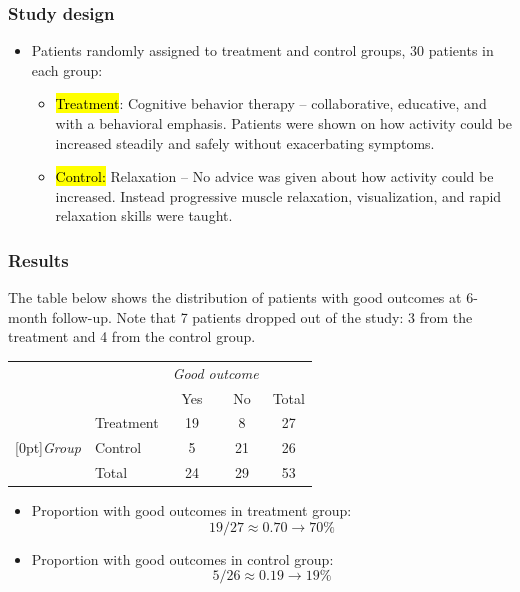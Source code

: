 
\begin{frame}
\frametitle{Study design}

\begin{itemize}

\item Patients randomly assigned to treatment and control groups, 30 patients in each group:
\begin{itemize}
\item \hl{Treatment}: Cognitive behavior therapy -- collaborative, educative, and with a behavioral emphasis. Patients were shown on how activity could be increased steadily and safely without exacerbating symptoms.
\item \hl{Control:} Relaxation -- No advice was given about how activity could be increased. Instead progressive muscle relaxation, visualization, and rapid relaxation skills were taught.
\end{itemize}

\end{itemize}

\end{frame}


\begin{frame}
\frametitle{Results}

The table below shows the distribution of patients with good outcomes at 6-month follow-up. Note that 7 patients dropped out of the study: 3 from the treatment and 4 from the control group.

\begin{center}
\begin{tabular}{ll  cc c} 
			&				& \multicolumn{2}{c}{\textit{Good outcome}} \\
\cline{3-4}
			&							& Yes 	& No 	& Total	\\
\cline{2-5}
							&Treatment 	& 19	 	& 8		& 27 	\\
\raisebox{1.5ex}[0pt]{\textit{Group}}	&Control		& 5	 	& 21	 	& 26 \\
\cline{2-5}
							&Total		& 24		& 29		& 53
\end{tabular}
\end{center}

\pause

\begin{itemize}

\item Proportion with good outcomes in treatment group:
\[ 19 / 27 \approx 0.70 \rightarrow 70\% \]

\pause

\item Proportion with good outcomes in control group:
\[ 5 / 26 \approx 0.19 \rightarrow 19\% \]

\end{itemize}

\end{frame}

